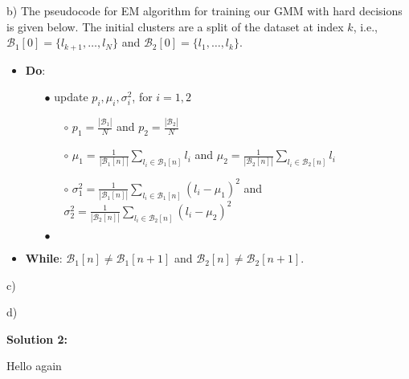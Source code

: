 \documentclass{article}
\begin{document}
    b) The pseudocode for EM algorithm for training our GMM with hard 
    decisions is given below. The initial clusters are a split of the  
    dataset at index $k$, i.e., $\mathcal{B}_1[0] = \{l_{k+1}, \ldots, l_N\}$ 
    and $\mathcal{B}_2[0] = \{l_1, \ldots, l_k\}$.
    \begin{itemize}
        \item \textbf{Do}: 
        \begin{itemize}
            \item[$\bullet$] update $p_i, \mu_i, \sigma_i^2$, for $i=1,2$
            \begin{itemize}
                \item[$\circ$] $p_1 = \frac{|\mathcal{B}_1|}{N}$ and $p_2 = \frac
                {|\mathcal{B}_2|}{N}$
                \item[$\circ$] $\mu_1 = \frac{1}{|\mathcal{B}_1[n]|}\sum_
                {l_i\in\mathcal{B}_1[n]}l_i$ and $\mu_2 = \frac{1}{|\mathcal{B}_2[n]|
                }\sum_{l_i\in\mathcal{B}_2[n]}l_i$
                \item[$\circ$] $\sigma_1^2 = \frac{1}{|\mathcal{B}_1[n]|}\sum_
                {l_i\in\mathcal{B}_1[n]}{(l_i - \mu_1)^2}$ and $\sigma_2^2 = \frac{1}
                {|\mathcal{B}_2[n]|}\sum_{l_i\in\mathcal{B}_2[n]}{(l_i - \mu_2)^2}$ 
            \end{itemize}
            \item[$\bullet$] 
        \end{itemize}
        \item \textbf{While}: $\mathcal{B}_1[n] \neq \mathcal{B}_1[n+1]$ and 
        $\mathcal{B}_2[n] \neq \mathcal{B}_2[n+1]$.
    \end{itemize}

    c)

    d)

    \vspace{0.5cm}

    \textbf{Solution 2: }

    Hello again
\end{document}

